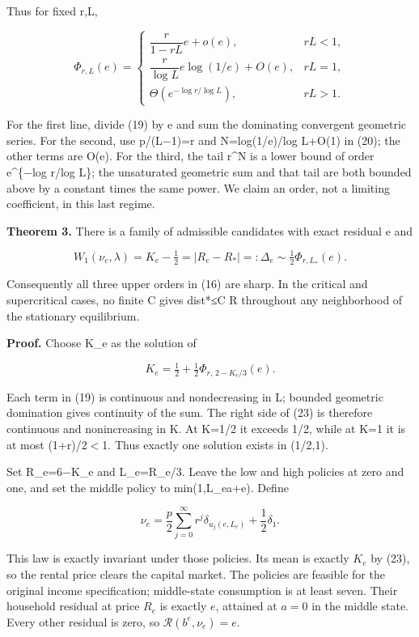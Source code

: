 \documentclass{article}
\begin{document}
Thus for fixed r,L,

\[
\Phi_{r,L}(e)=
\begin{cases}
\dfrac{r}{1-rL}e+o(e),&rL<1,\\[4pt]
\dfrac{r}{\log L}e\log(1/e)+O(e),&rL=1,\\[4pt]
\Theta(e^{-\log r/\log L}),&rL>1.
\end{cases}
\tag{21}
\]

For the first line, divide (19) by e and sum the dominating convergent geometric series. For the second, use p/(L−1)=r and N=log(1/e)/log L+O(1) in (20); the other terms are O(e). For the third, the tail r\^{}N is a lower bound of order e\^{}\{−log r/log L\}; the unsaturated geometric sum and that tail are both bounded above by a constant times the same power. We claim an order, not a limiting coefficient, in this last regime.

\textbf{Theorem 3.} There is a family of admissible candidates with exact residual e and

\[
W_1(\nu_e,\lambda)
=K_e-\tfrac12
=|R_e-R_*|
=:\Delta_e
\sim \tfrac12\Phi_{r,L_*}(e).
\tag{22}
\]

Consequently all three upper orders in (16) are sharp. In the critical and supercritical cases, no finite C gives dist*≤C R throughout any neighborhood of the stationary equilibrium.

\textbf{Proof.} Choose K\_e as the solution of

\[
K_e=\tfrac12+\tfrac12\Phi_{r,\,2-K_e/3}(e).
\tag{23}
\]

Each term in (19) is continuous and nondecreasing in L; bounded geometric domination gives continuity of the sum. The right side of (23) is therefore continuous and nonincreasing in K. At K=1/2 it exceeds 1/2, while at K=1 it is at most (1+r)/2\(\lt\)1. Thus exactly one solution exists in (1/2,1).

Set R\_e=6−K\_e and L\_e=R\_e/3. Leave the low and high policies at zero and one, and set the middle policy to min(1,L\_ea+e). Define

\[
\nu_e=\frac p2\sum_{j=0}^{\infty}r^j
\delta_{u_j(e,L_e)}+\frac12\delta_1.
\tag{24}
\]

This law is exactly invariant under those policies. Its mean is exactly \(K_e\) by (23), so the rental price clears the capital market. The policies are feasible for the original income specification; middle-state consumption is at least seven. Their household residual at price \(R_e\) is exactly \(e\), attained at \(a=0\) in the middle state. Every other residual is zero, so \(\mathcal R(b^e,\nu_e)=e\).
\end{document}
